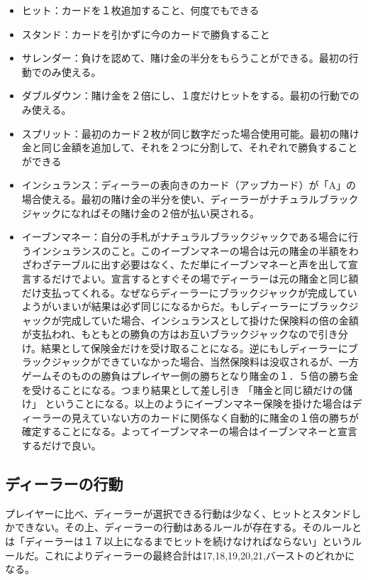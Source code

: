 \begin{itemize}
\item ヒット：カードを１枚追加すること、何度でもできる
\item スタンド：カードを引かずに今のカードで勝負すること
\item サレンダー：負けを認めて、賭け金の半分をもらうことができる。最初の行動でのみ使える。
\item ダブルダウン：賭け金を２倍にし、１度だけヒットをする。最初の行動でのみ使える。
\item スプリット：最初のカード２枚が同じ数字だった場合使用可能。最初の賭け金と同じ金額を追加して、それを２つに分割して、それぞれで勝負することができる
\item インシュランス：ディーラーの表向きのカード（アップカード）が「A」の場合使える。最初の賭け金の半分を使い、ディーラーがナチュラルブラックジャックになればその賭け金の２倍が払い戻される。
\item イーブンマネー：自分の手札がナチュラルブラックジャックである場合に行うインシュランスのこと。このイーブンマネーの場合は元の賭金の半額をわざわざテーブルに出す必要はなく、ただ単にイーブンマネーと声を出して宣言するだけでよい。宣言するとすぐその場でディーラーは元の賭金と同じ額だけ支払ってくれる。なぜならディーラーにブラックジャックが完成していようがいまいが結果は必ず同じになるからだ。もしディーラーにブラックジャックが完成していた場合、インシュランスとして掛けた保険料の倍の金額が支払われ、もともとの勝負の方はお互いブラックジャックなので引き分け。結果として保険金だけを受け取ることになる。逆にもしディーラーにブラックジャックができていなかった場合、当然保険料は没収されるが、一方ゲームそのものの勝負はプレイヤー側の勝ちとなり賭金の１．５倍の勝ち金を受けることになる。つまり結果として差し引き 「賭金と同じ額だけの儲け」 ということになる。以上のようにイーブンマネー保険を掛けた場合はディーラーの見えていない方のカードに関係なく自動的に賭金の１倍の勝ちが確定することになる。よってイーブンマネーの場合はイーブンマネーと宣言するだけで良い。
\end{itemize}

\subsection{ディーラーの行動}
プレイヤーに比べ、ディーラーが選択できる行動は少なく、ヒットとスタンドしかできない。その上、ディーラーの行動はあるルールが存在する。そのルールとは「ディーラーは１７以上になるまでヒットを続けなければならない」というルールだ。これによりディーラーの最終合計は17,18,19,20,21,バーストのどれかになる。

